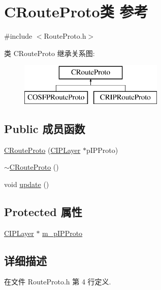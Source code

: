 \hypertarget{class_c_route_proto}{}\section{C\+Route\+Proto类 参考}
\label{class_c_route_proto}


{\ttfamily \#include $<$Route\+Proto.\+h$>$}

类 C\+Route\+Proto 继承关系图\+:\begin{figure}[H]
\begin{center}
\leavevmode
\includegraphics[height=2.000000cm]{class_c_route_proto}
\end{center}
\end{figure}
\subsection*{Public 成员函数}
\begin{DoxyCompactItemize}
\item 
\hyperlink{class_c_route_proto_a0af8908129d928acbadf7eba99d9b7e2}{C\+Route\+Proto} (\hyperlink{class_c_i_p_layer}{C\+I\+P\+Layer} $\ast$p\+I\+P\+Proto)
\item 
\hyperlink{class_c_route_proto_ae53c5d97f132645a6f5cc32be66dcd7b}{$\sim$\+C\+Route\+Proto} ()
\item 
void \hyperlink{class_c_route_proto_ac17d99e82f088ed1b50426584c65b2d1}{update} ()
\end{DoxyCompactItemize}
\subsection*{Protected 属性}
\begin{DoxyCompactItemize}
\item 
\hyperlink{class_c_i_p_layer}{C\+I\+P\+Layer} $\ast$ \hyperlink{class_c_route_proto_a215ec5768c5e1c1d1350506b800f3d02}{m\+\_\+p\+I\+P\+Proto}
\end{DoxyCompactItemize}


\subsection{详细描述}


在文件 Route\+Proto.\+h 第 4 行定义.



